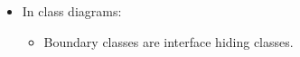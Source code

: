 \documentclass{article}
\begin{document}
\begin{itemize}
\begin{itemize}
		\item `Use case controllers' orchestrate what use case (or mode) the system is in.
		\begin{itemize}
			\item Use case controllers can be represented mathematically as Finite State Machines (FSMs)
		\end{itemize}
	\end{itemize}
	\item In class diagrams:
	\begin{itemize}
		\item Boundary classes are interface hiding classes.
	\end{itemize}
\end{itemize}

\ifdefined\iscombined
	\newpage
\else
	
\end{document}

